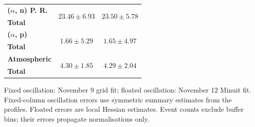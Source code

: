 \begin{table}
\begin{tabular}{lcc}
        \textbf{($\alpha$, n) P. R.} & \multirow{2}{*}{$23.46\pm6.93$} & \multirow{2}{*}{$23.50\pm5.78$} \\
        \textbf{Total} & & \\
        \hline

        \textbf{($\alpha$, p)} & \multirow{2}{*}{$1.66\pm5.29$} & \multirow{2}{*}{$1.65\pm4.97$} \\
        \textbf{Total} & & \\
        \hline

        \textbf{Atmospheric} & \multirow{2}{*}{$4.30\pm1.85$} & \multirow{2}{*}{$4.29\pm2.04$} \\
        \textbf{Total} & & \\
        \hline

        \hline\hline
    \end{tabular}
\par\smallskip\footnotesize Fixed oscillation: November 9 grid fit; floated oscillation: November 12 Minuit fit. Fixed-column oscillation errors use symmetric summary estimates from the profiles. Floated errors are local Hessian estimates. Event counts exclude buffer bins; their errors propagate normalisations only.
\end{table}
